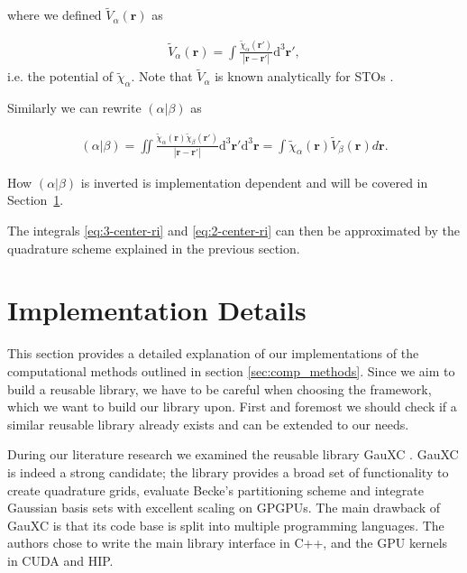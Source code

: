 \documentclass{article}
\begin{document}
where we defined $\tilde V_\alpha(\mathbf r)$ as

\begin{align}
  \tilde V_\alpha(\mathbf r) =
  \int \frac{\tilde\chi_\alpha(\mathbf r')}{|\mathbf r -
  \mathbf{r}'| } \mathrm d^3\mathbf r',
  \label{eq:potential-chi}
\end{align}
i.e. the potential of $\tilde\chi_\alpha$. Note that $\tilde V_\alpha$ is
known analytically for STOs \cite{Cohen2002}.

Similarly we can rewrite $(\alpha|\beta)$ as

\begin{align}
  (\alpha|\beta) =
  \iint \frac{\tilde\chi_\alpha(\mathbf
  r)\tilde\chi_\beta(\mathbf r')}{|\mathbf r - \mathbf{r}'| }
  \mathrm d ^3\mathbf r' \mathrm d^3\mathbf r = \int
  \tilde\chi_\alpha(\mathbf{r}) \tilde V_\beta(\mathbf{r}) d\mathbf{r}.
  \label{eq:2-center-ri}
\end{align}

How $(\alpha|\beta)$ is inverted is implementation dependent and will
be covered in Section~\ref{sec:Implementation}.

The integrals \eqref{eq:3-center-ri} and \eqref{eq:2-center-ri} can
then be approximated by the quadrature scheme explained in the previous section.

\section{Implementation Details}\label{sec:Implementation}

This section provides a detailed explanation of our implementations
of the computational methods outlined in section
\ref{sec:comp_methods}. Since we aim to build a reusable library, we
have to be careful when choosing the framework, which we want to
build our library upon. First and foremost we should check if a
similar reusable library already exists and can be extended to our needs.

During our literature research we examined the reusable library GauXC
\cite{WilliamsYoung2021, WilliamsYoung2020}. GauXC is indeed a
strong candidate; the library provides a broad set of functionality
to create quadrature grids, evaluate Becke's partitioning scheme and
integrate Gaussian basis sets with excellent scaling on GPGPUs. The
main drawback of GauXC is that its code base is split into
multiple programming languages. The authors chose to write the main library
interface in C++, and the GPU kernels in CUDA and HIP.
\end{document}
